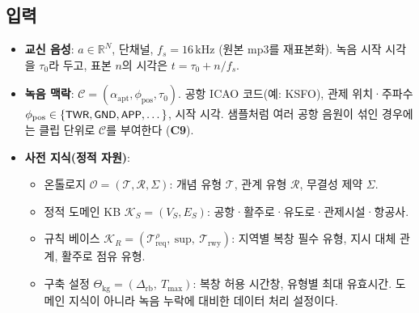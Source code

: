 \documentclass[10pt,a4paper]{article}
\newcommand{\KS}{\mathcal{K}_S}
\newcommand{\Ont}{\mathcal{O}}
\newcommand{\Ctx}{\mathcal{C}}
\newcommand{\Treq}{\mathcal{T}_{\mathrm{req}}}
\newcommand{\KR}{\mathcal{K}_R}
\newcommand{\Cfg}{\Theta_{\mathrm{kg}}}
\newcommand{\cmd}[1]{\textsf{\small #1}}
\newcommand{\ch}[1]{\textbf{\textcolor{red!60!black}{#1}}}
\begin{document}
\subsection{입력}
\begin{itemize}
\item \textbf{교신 음성}: $a \in \mathbb{R}^{N}$, 단채널, $f_s = 16\,\mathrm{kHz}$ (원본 mp3를 재표본화). 녹음 시작 시각을 $\tau_0$라 두고, 표본 $n$의 시각은 $t = \tau_0 + n/f_s$.
\item \textbf{녹음 맥락}: $\Ctx = (\alpha_{\mathrm{apt}}, \phi_{\mathrm{pos}}, \tau_0)$. 공항 ICAO 코드(예: \cmd{KSFO}), 관제 위치·주파수 $\phi_{\mathrm{pos}} \in \{\cmd{TWR},\cmd{GND},\cmd{APP},\dots\}$, 시작 시각. 샘플처럼 여러 공항 음원이 섞인 경우에는 클립 단위로 $\Ctx$를 부여한다 (\ch{C9}).
\item \textbf{사전 지식(정적 자원)}:
  \begin{itemize}
  \item 온톨로지 $\Ont = (\mathcal{T}, \mathcal{R}, \Sigma)$: 개념 유형 $\mathcal{T}$, 관계 유형 $\mathcal{R}$, 무결성 제약 $\Sigma$.
  \item 정적 도메인 KB $\KS = (V_S, E_S)$: 공항·활주로·유도로·관제시설·항공사.
  \item 규칙 베이스 $\KR = (\Treq^{\rho},\ \mathrm{sup},\ \mathcal{T}_{\mathrm{rwy}})$: 지역별 복창 필수 유형, 지시 대체 관계, 활주로 점유 유형.
  \item 구축 설정 $\Cfg = (\Delta_{\mathrm{rb}},\ T_{\max})$: 복창 허용 시간창, 유형별 최대 유효시간. 도메인 지식이 아니라 녹음 누락에 대비한 데이터 처리 설정이다.
  \end{itemize}
\end{itemize}
\end{document}
